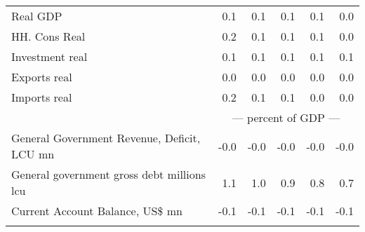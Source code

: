 \documentclass{article}
\begin{document}
\begin{table}[ht]
\begin{tabular}{lrrrrr}
Real GDP & 0.1 & 0.1 & 0.1 & 0.1 & 0.0 \\
HH. Cons Real & 0.2 & 0.1 & 0.1 & 0.1 & 0.0 \\
Investment real & 0.1 & 0.1 & 0.1 & 0.1 & 0.1 \\
Exports real & 0.0 & 0.0 & 0.0 & 0.0 & 0.0 \\
Imports real & 0.2 & 0.1 & 0.1 & 0.0 & 0.0 \\
&\multicolumn{5}{c}{--- percent of GDP ---}           \\
General Government Revenue, Deficit, LCU mn & -0.0 & -0.0 & -0.0 & -0.0 & -0.0 \\
General government gross debt millions lcu & 1.1 & 1.0 & 0.9 & 0.8 & 0.7 \\
Current Account Balance, US\$ mn & -0.1 & -0.1 & -0.1 & -0.1 & -0.1 \\
&\multicolumn{5}{c}{ }           \\
\bottomrule
\end{tabular}
\end{table}
\end{document}
